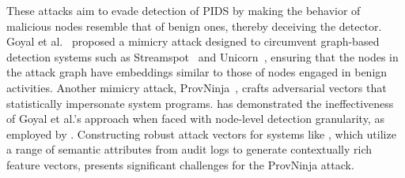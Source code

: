  These attacks aim to evade detection of PIDS by making the behavior of malicious nodes resemble that of benign ones, thereby deceiving the detector. Goyal et al.~\cite{goyal2023sometimes} proposed a mimicry attack designed to circumvent graph-based detection systems such as Streamspot~\cite{streamspot} and Unicorn~\cite{han2020unicorn}, ensuring that the nodes in the attack graph have embeddings similar to those of nodes engaged in benign activities. Another mimicry attack, ProvNinja~\cite{mukherjee2023evading}, crafts adversarial vectors that statistically impersonate system programs. \flash has demonstrated the ineffectiveness of Goyal et al.'s approach when faced with node-level detection granularity, as employed by \Sys. Constructing robust attack vectors for systems like \Sys, which utilize a range of semantic attributes from audit logs to generate contextually rich feature vectors, presents significant challenges for the ProvNinja attack.